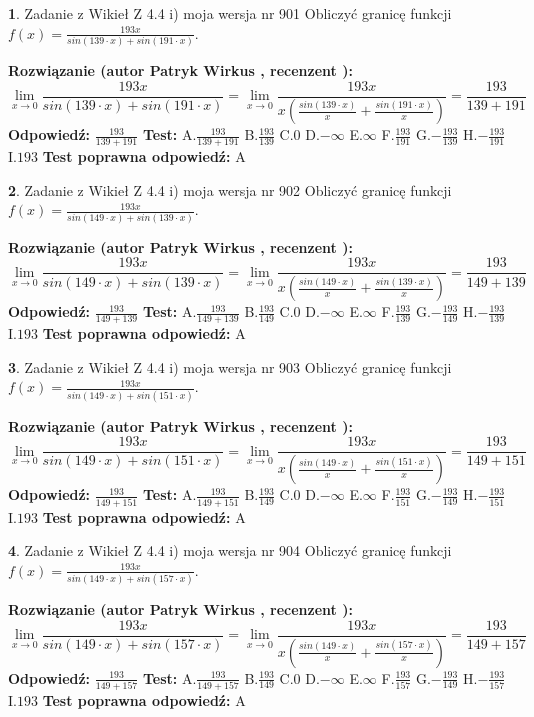\documentclass[12pt, a4paper]{article}
\theoremstyle{definition} %
\newtheorem{zad}{}
\newcommand{\zadStart}[1]{\begin{zad}#1\newline}
\newcommand{\zadStop}{\end{zad}}
\newcommand{\rozwStart}[2]{\noindent \textbf{Rozwiązanie (autor #1 , recenzent #2): }\newline}
\newcommand{\rozwStop}{\newline}
\newcommand{\odpStart}{\noindent \textbf{Odpowiedź:}\newline}
\newcommand{\odpStop}{\newline}
\newcommand{\testStart}{\noindent \textbf{Test:}\newline}
\newcommand{\testStop}{\newline}
\newcommand{\kluczStart}{\noindent \textbf{Test poprawna odpowiedź:}\newline}
\newcommand{\kluczStop}{\newline}
\begin{document}
\zadStart{Zadanie z Wikieł Z 4.4 i) moja wersja nr 901}
Obliczyć granicę funkcji $f(x)=\frac{193x}{sin(139\cdot x) +sin(191\cdot x)}$.
\zadStop
\rozwStart{Patryk Wirkus}{}
$$\lim\limits_{x\to 0}\frac{193x}{sin(139\cdot x) +sin(191\cdot x)}=\lim\limits_{x\to 0}\frac{193x}{x(\frac{sin(139\cdot x)}{x}+\frac{sin(191\cdot x)}{x})}=\frac{193}{139+191}$$
\rozwStop
\odpStart
$\frac{193}{139+191}$
\odpStop
\testStart
A.$\frac{193}{139+191}$
B.$\frac{193}{139}$
C.$0$
D.$-\infty$
E.$\infty$
F.$\frac{193}{191}$
G.$-\frac{193}{139}$
H.$-\frac{193}{191}$
I.$193$
\testStop
\kluczStart
A
\kluczStop



\zadStart{Zadanie z Wikieł Z 4.4 i) moja wersja nr 902}
Obliczyć granicę funkcji $f(x)=\frac{193x}{sin(149\cdot x) +sin(139\cdot x)}$.
\zadStop
\rozwStart{Patryk Wirkus}{}
$$\lim\limits_{x\to 0}\frac{193x}{sin(149\cdot x) +sin(139\cdot x)}=\lim\limits_{x\to 0}\frac{193x}{x(\frac{sin(149\cdot x)}{x}+\frac{sin(139\cdot x)}{x})}=\frac{193}{149+139}$$
\rozwStop
\odpStart
$\frac{193}{149+139}$
\odpStop
\testStart
A.$\frac{193}{149+139}$
B.$\frac{193}{149}$
C.$0$
D.$-\infty$
E.$\infty$
F.$\frac{193}{139}$
G.$-\frac{193}{149}$
H.$-\frac{193}{139}$
I.$193$
\testStop
\kluczStart
A
\kluczStop



\zadStart{Zadanie z Wikieł Z 4.4 i) moja wersja nr 903}
Obliczyć granicę funkcji $f(x)=\frac{193x}{sin(149\cdot x) +sin(151\cdot x)}$.
\zadStop
\rozwStart{Patryk Wirkus}{}
$$\lim\limits_{x\to 0}\frac{193x}{sin(149\cdot x) +sin(151\cdot x)}=\lim\limits_{x\to 0}\frac{193x}{x(\frac{sin(149\cdot x)}{x}+\frac{sin(151\cdot x)}{x})}=\frac{193}{149+151}$$
\rozwStop
\odpStart
$\frac{193}{149+151}$
\odpStop
\testStart
A.$\frac{193}{149+151}$
B.$\frac{193}{149}$
C.$0$
D.$-\infty$
E.$\infty$
F.$\frac{193}{151}$
G.$-\frac{193}{149}$
H.$-\frac{193}{151}$
I.$193$
\testStop
\kluczStart
A
\kluczStop



\zadStart{Zadanie z Wikieł Z 4.4 i) moja wersja nr 904}
Obliczyć granicę funkcji $f(x)=\frac{193x}{sin(149\cdot x) +sin(157\cdot x)}$.
\zadStop
\rozwStart{Patryk Wirkus}{}
$$\lim\limits_{x\to 0}\frac{193x}{sin(149\cdot x) +sin(157\cdot x)}=\lim\limits_{x\to 0}\frac{193x}{x(\frac{sin(149\cdot x)}{x}+\frac{sin(157\cdot x)}{x})}=\frac{193}{149+157}$$
\rozwStop
\odpStart
$\frac{193}{149+157}$
\odpStop
\testStart
A.$\frac{193}{149+157}$
B.$\frac{193}{149}$
C.$0$
D.$-\infty$
E.$\infty$
F.$\frac{193}{157}$
G.$-\frac{193}{149}$
H.$-\frac{193}{157}$
I.$193$
\testStop
\kluczStart
A
\kluczStop
\end{document}
